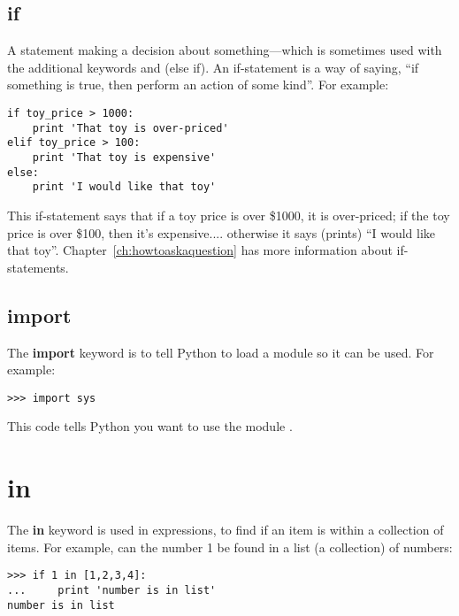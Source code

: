 \subsection*{if}

A statement making a decision about something---which is sometimes used with the additional keywords  and  (else if).  An if-statement is a way of saying, ``if something is true, then perform an action of some kind''.  For example:

\begin{listing}
\begin{verbatim}
if toy_price > 1000:
    print 'That toy is over-priced'
elif toy_price > 100:
    print 'That toy is expensive'
else:
    print 'I would like that toy'
\end{verbatim}
\end{listing}

This if-statement says that if a toy price is over \$1000, it is over-priced; if the toy price is over \$100, then it's expensive.... otherwise it says (prints) ``I would like that toy''. Chapter~\ref{ch:howtoaskaquestion} has more information about if-statements.

\subsection*{import}

The \textbf{import} keyword is to tell Python to load a module so it can be used. For example:

\begin{listing}
\begin{verbatim}
>>> import sys
\end{verbatim}
\end{listing}

This code tells Python you want to use the module .

\section*{in}

The \textbf{in} keyword is used in expressions, to find if an item is within a collection of items. For example, can the number 1 be found in a list (a collection) of numbers:

\begin{listing}
\begin{verbatim}
>>> if 1 in [1,2,3,4]:
...     print 'number is in list'
number is in list
\end{verbatim}
\end{listing}

